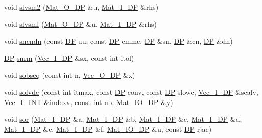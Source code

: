 \begin{DoxyCompactItemize}
\item 
void \mbox{\hyperlink{namespaceNR_acedae47de69f9d0402a28d9a716b2fa2}{slvsm2}} (\mbox{\hyperlink{namespaceNR_adc1f8da33094b6bbeb1f5f899515ce54}{Mat\+\_\+\+O\+\_\+\+DP}} \&u, \mbox{\hyperlink{namespaceNR_a2b8abfda8fffad6ba0a1b5a4c0773dbf}{Mat\+\_\+\+I\+\_\+\+DP}} \&rhs)
\item 
void \mbox{\hyperlink{namespaceNR_ae63f80a859ca5a86551c9b2f4b04fdef}{slvsml}} (\mbox{\hyperlink{namespaceNR_adc1f8da33094b6bbeb1f5f899515ce54}{Mat\+\_\+\+O\+\_\+\+DP}} \&u, \mbox{\hyperlink{namespaceNR_a2b8abfda8fffad6ba0a1b5a4c0773dbf}{Mat\+\_\+\+I\+\_\+\+DP}} \&rhs)
\item 
void \mbox{\hyperlink{namespaceNR_a047d02acf11afe02da3c1da8c748e208}{sncndn}} (const \mbox{\hyperlink{namespaceNR_af6ff762dd605ff477b8e52387253a02a}{DP}} uu, const \mbox{\hyperlink{namespaceNR_af6ff762dd605ff477b8e52387253a02a}{DP}} emmc, \mbox{\hyperlink{namespaceNR_af6ff762dd605ff477b8e52387253a02a}{DP}} \&sn, \mbox{\hyperlink{namespaceNR_af6ff762dd605ff477b8e52387253a02a}{DP}} \&cn, \mbox{\hyperlink{namespaceNR_af6ff762dd605ff477b8e52387253a02a}{DP}} \&dn)
\item 
\mbox{\hyperlink{namespaceNR_af6ff762dd605ff477b8e52387253a02a}{DP}} \mbox{\hyperlink{namespaceNR_ad2b7cce8e123dc0d8dc69bf32a719f94}{snrm}} (\mbox{\hyperlink{namespaceNR_a9f943da53862537c552e2a770cb170ae}{Vec\+\_\+\+I\+\_\+\+DP}} \&sx, const int itol)
\item 
void \mbox{\hyperlink{namespaceNR_a1357ef8a6e9ec8dd977c9280119cb41b}{sobseq}} (const int n, \mbox{\hyperlink{namespaceNR_a970094d23441f8ef6a45282a7eb2103d}{Vec\+\_\+\+O\+\_\+\+DP}} \&x)
\item 
void \mbox{\hyperlink{namespaceNR_aed31ba4292a87797a7eef501659413d2}{solvde}} (const int itmax, const \mbox{\hyperlink{namespaceNR_af6ff762dd605ff477b8e52387253a02a}{DP}} conv, const \mbox{\hyperlink{namespaceNR_af6ff762dd605ff477b8e52387253a02a}{DP}} slowc, \mbox{\hyperlink{namespaceNR_a9f943da53862537c552e2a770cb170ae}{Vec\+\_\+\+I\+\_\+\+DP}} \&scalv, \mbox{\hyperlink{namespaceNR_ae67ce7dc86a8a64a7ce73c3c030ff610}{Vec\+\_\+\+I\+\_\+\+I\+NT}} \&indexv, const int nb, \mbox{\hyperlink{namespaceNR_ad1513aa4697878ed3bff0b8b3c9dd910}{Mat\+\_\+\+I\+O\+\_\+\+DP}} \&y)
\item 
void \mbox{\hyperlink{namespaceNR_a20465364d77d93fb2f8ec0a0aca6f509}{sor}} (\mbox{\hyperlink{namespaceNR_a2b8abfda8fffad6ba0a1b5a4c0773dbf}{Mat\+\_\+\+I\+\_\+\+DP}} \&a, \mbox{\hyperlink{namespaceNR_a2b8abfda8fffad6ba0a1b5a4c0773dbf}{Mat\+\_\+\+I\+\_\+\+DP}} \&b, \mbox{\hyperlink{namespaceNR_a2b8abfda8fffad6ba0a1b5a4c0773dbf}{Mat\+\_\+\+I\+\_\+\+DP}} \&c, \mbox{\hyperlink{namespaceNR_a2b8abfda8fffad6ba0a1b5a4c0773dbf}{Mat\+\_\+\+I\+\_\+\+DP}} \&d, \mbox{\hyperlink{namespaceNR_a2b8abfda8fffad6ba0a1b5a4c0773dbf}{Mat\+\_\+\+I\+\_\+\+DP}} \&e, \mbox{\hyperlink{namespaceNR_a2b8abfda8fffad6ba0a1b5a4c0773dbf}{Mat\+\_\+\+I\+\_\+\+DP}} \&f, \mbox{\hyperlink{namespaceNR_ad1513aa4697878ed3bff0b8b3c9dd910}{Mat\+\_\+\+I\+O\+\_\+\+DP}} \&u, const \mbox{\hyperlink{namespaceNR_af6ff762dd605ff477b8e52387253a02a}{DP}} rjac)

\end{DoxyCompactItemize}
